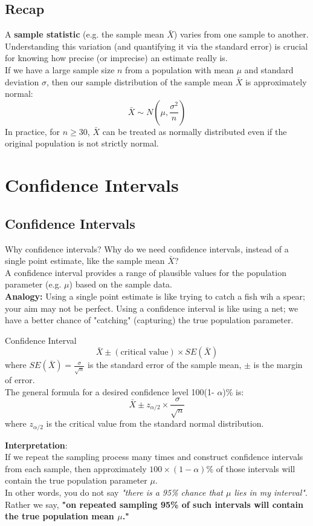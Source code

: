 \documentclass[10pt, total={6in, 8in}]{extarticle}
\begin{document}
\subsection{Recap}
A \textbf{sample statistic} (e.g. the sample mean $\bar{X}$) varies from one sample to another. Understanding this variation (and quantifying it via the standard error) is crucial for knowing how precise (or imprecise) an estimate really is. \\[2ex]
If we have a large sample size $n$ from a population with mean $\mu$ and standard deviation $\sigma$, then our sample distribution of the sample mean $\bar{X}$ is approximately normal:
$$\bar{X} \sim N\left(\mu, \frac{\sigma^2}{n}\right)$$
In practice, for $n \geq 30$, $\bar{X}$ can be treated as normally distributed even if the original population is not strictly normal.

\section{Confidence Intervals}

\subsection{Confidence Intervals}
\begin{conceptbox}{Why confidence intervals?}{}
    Why do we need confidence intervals, instead of a single point estimate, like the sample mean $\bar{X}$? \\

    A confidence interval provides a range of plausible values for the population parameter (e.g. $\mu$) based on the sample data. \\

    \textbf{Analogy:}  Using a single point estimate is like trying to catch a fish wih a spear; your aim may not be perfect. Using a confidence interval is like using a net; we have a better chance of "catching" (capturing) the true population parameter.
\end{conceptbox}
\begin{definitionbox}{Confidence Interval}{}
    $$\bar{X} \pm (\text{critical value}) \times SE(\bar{X})$$
    where $SE(\bar{X}) = \frac{\sigma}{\sqrt{n}}$ is the standard error of the sample mean, $\pm$ is the margin of error. \\
    The general formula for a desired confidence level 100(1- $\alpha$)\% is:
    $$\bar{X} \pm z_{\alpha/2} \times \frac{\sigma}{\sqrt{n}}$$
    where $z_{\alpha/2}$ is the critical value from the standard normal distribution.
\end{definitionbox}
\noindent\textbf{Interpretation}: \\
If we repeat the sampling process many times and construct confidence intervals from each sample, then approximately $100 \times (1 - \alpha)\%$ of those intervals will contain the true population parameter $\mu$.\\
In other words, you do not say \emph{"there is a 95\% chance that $\mu$ lies in my interval"}. Rather we say, \textbf{"on repeated sampling 95\% of such intervals will contain the true population mean $\mu$."}
\end{document}
